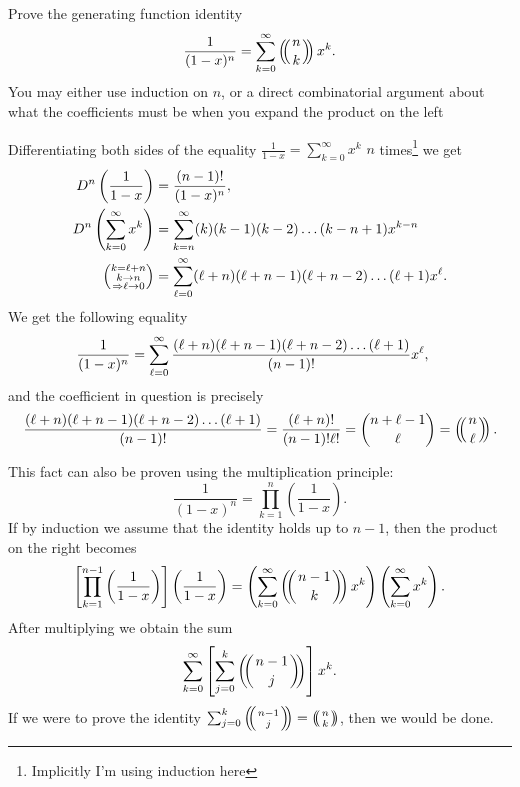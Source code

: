 \documentclass[12pt]{memoir}
\begin{document}
\begin{Ej}[Exercise 4]
Prove the generating function identity
$$\frac{1}{(1-x)^n}=\sum_{k=0}^\infty \multinom{n}{k}x^k.$$
You may either use induction on $n$, or a direct combinatorial argument about what the coefficients
must be when you expand the product on the left
\end{Ej}

\begin{ptcbr}
   Differentiating both sides of the equality $\frac{1}{1-x}=\sum_{k=0}^\infty x^k$ $n$ times\footnote{Implicitly I'm using induction here} we get 
   \begin{align*}
    D^n\left(\frac{1}{1-x}\right)&=\frac{(n-1)!}{(1-x)^n},\\
    D^n\left(\sum_{k=0}^\infty x^k\right)&=\sum_{k=n}^\infty (k)(k-1)(k-2)\dots(k-n+1)x^{k-n}\\
    \left(\substack{k=\ell+n\\k\to n\\\Rightarrow \ell\to 0}\right)&=\sum_{\ell=0}^\infty (\ell+n)(\ell+n-1)(\ell+n-2)\dots(\ell+1)x^{\ell}.
   \end{align*}
   We get the following equality
   \begin{align*}
    \frac{1}{(1-x)^n}&=\sum_{\ell=0}^\infty \frac{(\ell+n)(\ell+n-1)(\ell+n-2)\dots(\ell+1)}{(n-1)!}x^{\ell},
   \end{align*}
   and the coefficient in question is precisely
   $$\frac{(\l+n)(\l+n-1)(\l+n-2)\dots(\l+1)}{(n-1)!}=\frac{(\l+n)!}{(n-1)!\l!}=\binom{n+\l-1}{\l}=\multinom{n}{\l}.$$
\end{ptcbr}

\begin{ptcb}
    This fact can also be proven using the multiplication principle:
    $$\frac{1}{(1-x)^n}=\prod_{k=1}^n\left(\frac{1}{1-x}\right).$$
    If by induction we assume that the identity holds up to $n-1$, then the product on the right becomes
    $$\left\lbrack\prod_{k=1}^{n-1}\left(\frac{1}{1-x}\right)\right\rbrack\left(\frac{1}{1-x}\right)=\left(\sum_{k=0}^\infty \multinom{n-1}{k}x^k\right)\left(\sum_{k=0}^\infty x^k\right).$$
    After multiplying we obtain the sum 
    $$\sum_{k=0}^\infty\left\lbrack\sum_{j=0}^k\multinom{n-1}{j}\right\rbrack x^k.$$
    If we were to prove the identity $\sum_{j=0}^k\multinom{n-1}{j}=\multinom{n}{k}$, then we would be done.
\end{ptcb}
\end{document}
